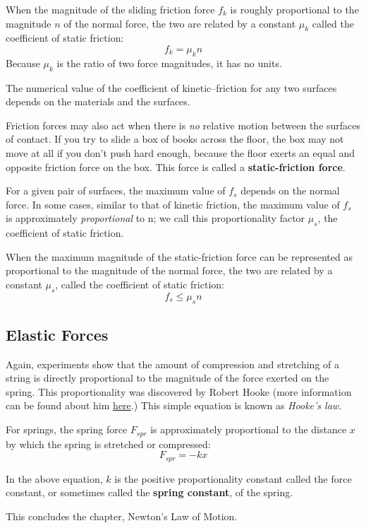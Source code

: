 \begin{defi}
When the magnitude of the sliding friction force $f_k$ is roughly proportional to the magnitude $n$ of the normal force, the two are related by a constant $\mu_k$ called the coefficient of static friction:
$$f_k = \mu_k n$$
Because $\mu_k$ is the ratio of two force magnitudes, it has no units.
\end{defi}

The numerical value of the coefficient of kinetic--friction for any two surfaces depends on the materials and the surfaces.

Friction forces may also act when there is \emph{no} relative motion between the surfaces of contact. If you try to slide a box of books across the floor, the box may not move at all if you don't push hard enough, because the floor exerts an equal and opposite friction force on the box. This force is called a \textbf{static-friction force}.

For a given pair of surfaces, the maximum value of $f_s$ depends on the normal force. In some cases, similar to that of kinetic friction, the maximum value of $f_s$ is approximately \emph{proportional} to n; we call this proportionality factor $\mu_s$, the coefficient of static friction.

\begin{defi}
When the maximum magnitude of the static-friction force can be represented as proportional to the magnitude of the normal force, the two are related by a constant $\mu_s$, called the coefficient of static friction:
$$ f_s \leq \mu_sn$$
\end{defi}

\subsection{Elastic Forces}
Again, experiments show that the amount of compression and stretching of a string is directly proportional to the magnitude of the force exerted on the spring. This proportionality was discovered by Robert Hooke (more information can be found about him \href{http://www.roberthooke.org.uk/intro.htm}{here}.) This simple equation is known as \emph{Hooke's law}.

\begin{form}
For springs, the spring force $F_{spr}$ is approximately proportional to the distance $x$ by which the spring is stretched or compressed:
$$F_{spr} = -kx$$
\end{form}
In the above equation, $k$ is the positive proportionality constant called the force constant, or sometimes called the \textbf{spring constant}, of the spring.

This concludes the chapter, Newton's Law of Motion.